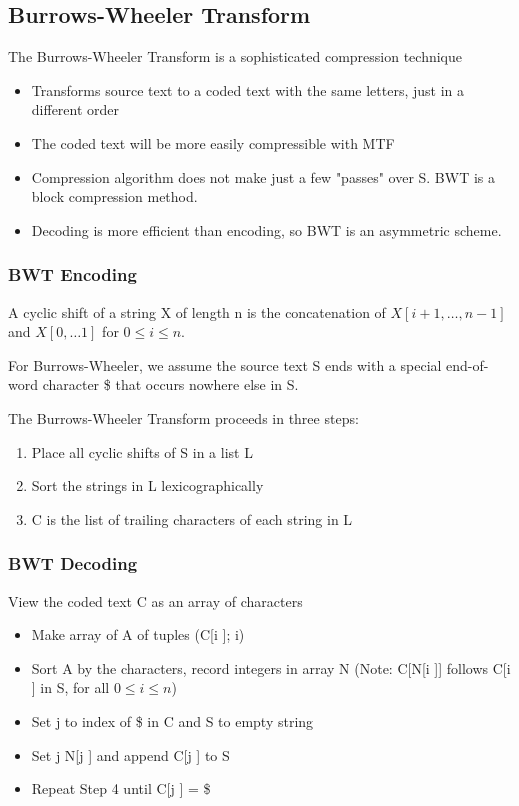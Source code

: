 \documentclass{article}
\begin{document}
\subsection*{Burrows-Wheeler Transform}
The Burrows-Wheeler Transform is a sophisticated compression technique
\begin{itemize}
\item Transforms source text to a coded text with the same letters, just in a different order
\item The coded text will be more easily compressible with MTF
\item Compression algorithm does not make just a few "passes" over S. BWT is a block compression method.
\item Decoding is more efficient than encoding,
so BWT is an asymmetric scheme.
\end{itemize}

\subsubsection*{BWT Encoding}
A cyclic shift of a string X of length n is the concatenation of \(X[i + 1, \ldots, n -1]\) and \(X[0, \ldots 1]\) for \(0 \leq i \leq n\). 


For Burrows-Wheeler, we assume the source text S ends with a special
end-of-word character \$ that occurs nowhere else in S.


The Burrows-Wheeler Transform proceeds in three steps:
\begin{enumerate}
\item Place all cyclic shifts of S in a list L
\item Sort the strings in L lexicographically
\item C is the list of trailing characters of each string in L
\end{enumerate}

\subsubsection*{BWT Decoding}
View the coded text C as an array of characters
\begin{itemize}
\item Make array of A of tuples (C[i ]; i)
\item Sort A by the characters, record integers in array N
(Note: C[N[i ]] follows C[i ] in S, for all \(0 \leq i \leq n\))
\item Set j to index of \$ in C and S to empty string
\item  Set j   N[j ] and append C[j ] to S
\item Repeat Step 4 until C[j ] = \$
\end{itemize}
\end{document}
